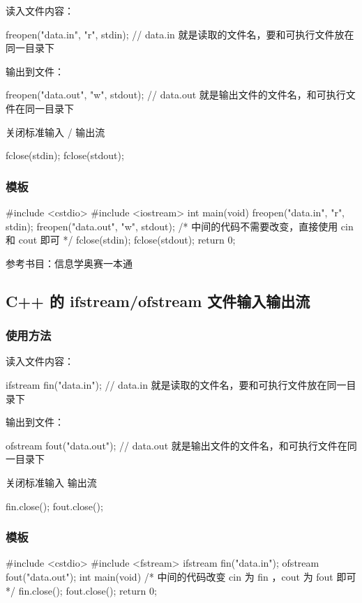 读入文件内容：

\begin{cppcode}
freopen("data.in", "r", stdin);
// data.in 就是读取的文件名，要和可执行文件放在同一目录下
\end{cppcode}

输出到文件：

\begin{cppcode}
freopen("data.out", "w", stdout);
// data.out 就是输出文件的文件名，和可执行文件在同一目录下
\end{cppcode}

关闭标准输入 / 输出流  

\begin{cppcode}
fclose(stdin);
fclose(stdout);
\end{cppcode}

\subsubsection{模板}

\begin{cppcode}
#include <cstdio>
#include <iostream>
int main(void) {
  freopen("data.in", "r", stdin);
  freopen("data.out", "w", stdout);
  /*
  中间的代码不需要改变，直接使用 cin 和 cout 即可
  */
  fclose(stdin);
  fclose(stdout);
  return 0;
}
\end{cppcode}

参考书目：信息学奥赛一本通

\subsection{C++ 的 ifstream/ofstream 文件输入输出流}

\subsubsection{使用方法}

读入文件内容：

\begin{cppcode}
ifstream fin("data.in");
// data.in 就是读取的文件名，要和可执行文件放在同一目录下
\end{cppcode}

输出到文件：

\begin{cppcode}
ofstream fout("data.out");
// data.out 就是输出文件的文件名，和可执行文件在同一目录下
\end{cppcode}

关闭标准输入  输出流

\begin{cppcode}
fin.close();
fout.close();
\end{cppcode}

\subsubsection{模板}

\begin{cppcode}
#include <cstdio>
#include <fstream>
ifstream fin("data.in");
ofstream fout("data.out");
int main(void) {
  /*
  中间的代码改变 cin 为 fin ，cout 为 fout 即可
  */
  fin.close();
  fout.close();
  return 0;
}
\end{cppcode}

